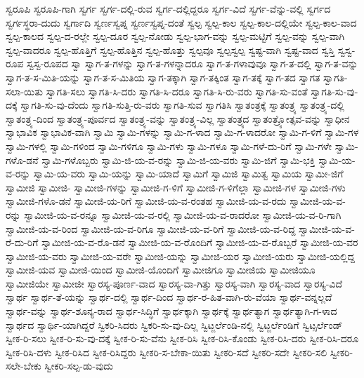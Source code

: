 {ಸ್ವರೂಪಿ
ಸ್ವರೂಪಿ-ಗಾಗಿ
ಸ್ವರ್ಗ
ಸ್ವರ್ಗ-ದಲ್ಲಿ-ರುವ
ಸ್ವರ್ಗ-ದಲ್ಲಿದ್ದರೂ
ಸ್ವರ್ಗ-ವಿದೆ
ಸ್ವರ್ಗ-ವೆನ್ನು-ವಲ್ಲಿ
ಸ್ವರ್ಗದ
ಸ್ವರ್ಗಸ್ಥರಾ-ದುದು
ಸ್ವರ್ಗಾದಿ
ಸ್ವರ್ಣಸ್ವಪ್ನ
ಸ್ವರ್ಣಸ್ವಪ್ನ-ದಂತೆ
ಸ್ವಲ್ಪ
ಸ್ವಲ್ಪ-ಕಾಲ
ಸ್ವಲ್ಪ-ಕಾಲ-ದಲ್ಲಿಯೇ
ಸ್ವಲ್ಪ-ಕಾಲ-ವಾದ
ಸ್ವಲ್ಪ-ಕಾಲದ
ಸ್ವಲ್ಪ-ದ-ರಲ್ಲೇ
ಸ್ವಲ್ಪ-ದೂರ
ಸ್ವಲ್ಪ-ನೋಡು
ಸ್ವಲ್ಪ-ಭಾಗ-ವನ್ನು
ಸ್ವಲ್ಪ-ಮಟ್ಟಿಗೆ
ಸ್ವಲ್ಪ-ವನ್ನು
ಸ್ವಲ್ಪ-ವಾಗಿ
ಸ್ವಲ್ಪ-ವಾದರೂ
ಸ್ವಲ್ಪ-ಹೊತ್ತಿಗೆ
ಸ್ವಲ್ಪ-ಹೊತ್ತಿನ
ಸ್ವಲ್ಪ-ಹೊತ್ತು
ಸ್ವಲ್ಪವೂ
ಸ್ವಲ್ಪಸ್ವಲ್ಪ
ಸ್ವಷ್ಟ-ವಾಗಿ
ಸ್ವಷ್ಟ-ವಾದ
ಸ್ವಸ್ತಿ
ಸ್ವಸ್ವ-ರೂಪ
ಸ್ವಸ್ವ-ರೂಪದ
ಸ್ವಾ
ಸ್ವಾಗ-ತ-ಗಳನ್ನು
ಸ್ವಾಗ-ತ-ಗಳನ್ನಾದರೂ
ಸ್ವಾಗ-ತ-ಗಳಾವುವೂ
ಸ್ವಾಗ-ತ-ದಲ್ಲಿ
ಸ್ವಾಗ-ತ-ವನ್ನು
ಸ್ವಾಗ-ತ-ಸ-ಮಿತಿ-ಯನ್ನು
ಸ್ವಾಗ-ತ-ಸ-ಮಿತಿಯ
ಸ್ವಾಗ-ತಕ್ಕಾಗಿ
ಸ್ವಾಗ-ತಕ್ಕಿಂತ
ಸ್ವಾಗ-ತಕ್ಕೆ
ಸ್ವಾಗ-ತದ
ಸ್ವಾಗತ
ಸ್ವಾಗತಿ-ಸಲಾ-ಯಿತು
ಸ್ವಾಗತಿ-ಸಲು
ಸ್ವಾಗತಿ-ಸಿ-ದರು
ಸ್ವಾಗತಿ-ಸಿ-ದರೂ
ಸ್ವಾಗತಿ-ಸಿ-ರು-ವರು
ಸ್ವಾಗತಿ-ಸು-ವಂತೆ
ಸ್ವಾಗತಿ-ಸು-ವು-ದಕ್ಕೆ
ಸ್ವಾಗತಿ-ಸು-ವು-ದೆಂದು
ಸ್ವಾಗತಿ-ಸುತ್ತಿ-ರು-ವರು
ಸ್ವಾಗತಿ-ಸುವ
ಸ್ವಾಗತಿಸಿ
ಸ್ವಾತಂತ್ರಕ್ಕೆ
ಸ್ವಾತಂತ್ರ್ಯ
ಸ್ವಾತಂತ್ರ್ಯ-ದಲ್ಲಿ
ಸ್ವಾತಂತ್ರ್ಯ-ದಿಂದ
ಸ್ವಾತಂತ್ರ್ಯ-ಪೂರ್ವದ
ಸ್ವಾತಂತ್ರ್ಯ-ವನ್ನು
ಸ್ವಾತಂತ್ರ್ಯ-ವಿಲ್ಲ
ಸ್ವಾತಂತ್ರ್ಯದ
ಸ್ವಾತಂತ್ರ್ಯೋತ್ಸವ-ವನ್ನು
ಸ್ವಾಧೀನ
ಸ್ವಾಭಾವಿಕ
ಸ್ವಾಭಾವಿಕ-ವಾಗಿ
ಸ್ವಾಮಿ
ಸ್ವಾಮಿ-ಗಳನ್ನು
ಸ್ವಾಮಿ-ಗ-ಳಾದ
ಸ್ವಾಮಿ-ಗ-ಳಾದರೋ
ಸ್ವಾಮಿ-ಗ-ಳಿಗೆ
ಸ್ವಾಮಿ-ಗಳ
ಸ್ವಾಮಿ-ಗಳಲ್ಲಿ
ಸ್ವಾಮಿ-ಗಳಿಂದ
ಸ್ವಾಮಿ-ಗಳಿಗೂ
ಸ್ವಾಮಿ-ಗಳು
ಸ್ವಾಮಿ-ಗಳೂ
ಸ್ವಾಮಿ-ಗಳೆ-ದು-ರಿಗೆ
ಸ್ವಾಮಿ-ಗಳೇ
ಸ್ವಾಮಿ-ಗಳೊ-ಡನೆ
ಸ್ವಾಮಿ-ಗಳೊಬ್ಬರು
ಸ್ವಾಮಿ-ಜಿ-ಯ-ವ-ರನ್ನು
ಸ್ವಾಮಿ-ಜಿ-ಯ-ವರು
ಸ್ವಾಮಿ-ಜಿಗೆ
ಸ್ವಾಮಿ-ಭಕ್ತಿ
ಸ್ವಾಮಿ-ಯ-ವ-ರನ್ನು
ಸ್ವಾಮಿ-ಯ-ವರು
ಸ್ವಾಮಿ-ಯನ್ನು
ಸ್ವಾಮಿ-ಯಾದೆ
ಸ್ವಾಮಿಗೆ
ಸ್ವಾಮಿಜಿ
ಸ್ವಾಮಿತ್ವ
ಸ್ವಾಮಿಯ
ಸ್ವಾಮೀ-ಜಿಗೆ
ಸ್ವಾಮೀಜಿ
ಸ್ವಾಮೀಜಿ-
ಸ್ವಾಮೀಜಿ-ಗಳನ್ನು
ಸ್ವಾಮೀಜಿ-ಗ-ಳಿಗೆ
ಸ್ವಾಮೀಜಿ-ಗ-ಳಿಗೆಲ್ಲಾ
ಸ್ವಾಮೀಜಿ-ಗಳ
ಸ್ವಾಮೀಜಿ-ಗಳು
ಸ್ವಾಮೀಜಿ-ಗಳೊ-ಡನೆ
ಸ್ವಾಮೀಜಿ-ಯ-ರಿಗೆ
ಸ್ವಾಮೀಜಿ-ಯ-ವ-ರಂತಹ
ಸ್ವಾಮೀಜಿ-ಯ-ವ-ರದು
ಸ್ವಾಮೀಜಿ-ಯ-ವ-ರನ್ನು
ಸ್ವಾಮೀಜಿ-ಯ-ವ-ರನ್ನೂ
ಸ್ವಾಮೀಜಿ-ಯ-ವ-ರಲ್ಲಿ
ಸ್ವಾಮೀಜಿ-ಯ-ವ-ರಾದರೋ
ಸ್ವಾಮೀಜಿ-ಯ-ವ-ರಿ-ಗಾಗಿ
ಸ್ವಾಮೀಜಿ-ಯ-ವ-ರಿಂದ
ಸ್ವಾಮೀಜಿ-ಯ-ವ-ರಿಗೂ
ಸ್ವಾಮೀಜಿ-ಯ-ವ-ರಿಗೆ
ಸ್ವಾಮೀಜಿ-ಯ-ವ-ರಿದ್ದ
ಸ್ವಾಮೀಜಿ-ಯ-ವ-ರೆ-ದು-ರಿಗೆ
ಸ್ವಾಮೀಜಿ-ಯ-ವ-ರೊ-ಡನೆ
ಸ್ವಾಮೀಜಿ-ಯ-ವ-ರೊಂದಿಗೆ
ಸ್ವಾಮೀಜಿ-ಯ-ವ-ರೊಬ್ಬರೆ
ಸ್ವಾಮೀಜಿ-ಯ-ವರ
ಸ್ವಾಮೀಜಿ-ಯ-ವರು
ಸ್ವಾಮೀಜಿ-ಯ-ವರೇ
ಸ್ವಾಮೀಜಿ-ಯನ್ನು
ಸ್ವಾಮೀಜಿ-ಯರ
ಸ್ವಾಮೀಜಿ-ಯರು
ಸ್ವಾಮೀಜಿ-ಯಲ್ಲಿದ್ದ
ಸ್ವಾಮೀಜಿ-ಯವ
ಸ್ವಾಮೀಜಿ-ಯಿಂದ
ಸ್ವಾಮೀಜಿ-ಯೊಂದಿಗೆ
ಸ್ವಾಮೀಜಿಗೂ
ಸ್ವಾಮೀಜಿಯ
ಸ್ವಾಮೀಜಿಯೂ
ಸ್ವಾಮೀಜಿಯೇ
ಸ್ವಾಮೀಜೀ
ಸ್ವಾರಸ್ಯ-ಪೂರ್ಣ-ವಾದ
ಸ್ವಾರಸ್ಯ-ವಾ-ಗಿತ್ತು
ಸ್ವಾರಸ್ಯ-ವಾಗಿ
ಸ್ವಾರಸ್ಯ-ವಾದ
ಸ್ವಾರಸ್ಯ-ವಿದೆ
ಸ್ವಾರ್ಥ
ಸ್ವಾರ್ಥ-ತೆ-ಯನ್ನು
ಸ್ವಾರ್ಥ-ದಲ್ಲಿ
ಸ್ವಾರ್ಥ-ದಿಂದ
ಸ್ವಾರ್ಥ-ರ-ಹಿತ-ವಾಗಿ-ರು-ವೆಯಾ
ಸ್ವಾರ್ಥ-ವನ್ನಲ್ಲದೆ
ಸ್ವಾರ್ಥ-ವನ್ನು
ಸ್ವಾರ್ಥ-ಶೂನ್ಯ-ರಾದ
ಸ್ವಾರ್ಥ-ಸಿದ್ಧಿಗೆ
ಸ್ವಾರ್ಥಕ್ಕಾಗಿ
ಸ್ವಾರ್ಥಕ್ಕೆ
ಸ್ವಾರ್ಥತ್ಯಾಗ
ಸ್ವಾರ್ಥತ್ಯಾಗಿ-ಗ-ಳಾದ
ಸ್ವಾರ್ಥದ
ಸ್ವಾರ್ಥಿ-ಯಾಗಿದ್ದರೆ
ಸ್ವಿಕರಿ-ಸಿದರು
ಸ್ವಿಕರಿ-ಸು-ವು-ದಿಲ್ಲ
ಸ್ವಿಟ್ಜರ್ಲೆಂಡಿ-ನಲ್ಲಿ
ಸ್ವಿಟ್ಜರ್ಲೆಂಡಿಗೆ
ಸ್ವಿಟ್ಸರ್ಲೆಂಡ್
ಸ್ವೀಕ-ರಿ-ಸಲು
ಸ್ವೀಕ-ರಿ-ಸು-ವು-ದಕ್ಕೆ
ಸ್ವೀಕ-ರಿ-ಸು-ವೆನು
ಸ್ವೀಕ-ರಿಸಿ
ಸ್ವೀಕ-ರಿಸಿ-ಕೊಂಡು
ಸ್ವೀಕ-ರಿಸಿ-ದರು
ಸ್ವೀಕ-ರಿಸಿ-ದರೂ
ಸ್ವೀಕ-ರಿಸಿ-ದಳು
ಸ್ವೀಕ-ರಿಸಿದ
ಸ್ವೀಕ-ರಿಸಿದ್ದರು
ಸ್ವೀಕರಿ-ಸ-ಬೇಕಾ-ಯಿತು
ಸ್ವೀಕರಿ-ಸದೆ
ಸ್ವೀಕರಿ-ಸದೇ
ಸ್ವೀಕರಿ-ಸಲಿ
ಸ್ವೀಕರಿ-ಸಲೇ-ಬೇಕು
ಸ್ವೀಕರಿ-ಸಲ್ಪ-ಡು-ವುದು
}
